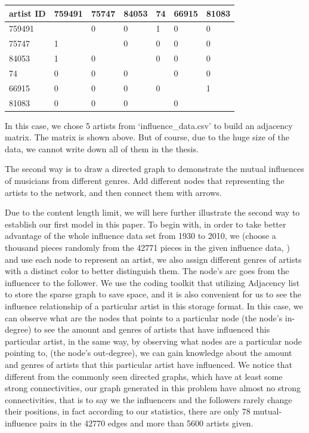 \documentclass[12pt]{article}
\begin{document}
\begin{table}[h]
\centering
\begin{tabular}{|l|l|l|l|l|l|l|}
\hline
artist ID & 759491 & 75747 & 84053 & 74 & 66915 & 81083 \\ \hline
759491              & \      & 0     & 0     & 1  & 0     & 0     \\ \hline
75747               & 1      & \     & 0     & 0  & 0     & 0     \\ \hline
84053               & 1      & 0     & \     & 0  & 0     & 0     \\ \hline
74                  & 0      & 0     & 0     & \  & 0     & 0     \\ \hline
66915               & 0      & 0     & 0     & 0  & \     & 1     \\ \hline
81083               & 0      & 0     & 0     &    & 0     & \     \\ \hline
\end{tabular}
\end{table}
\begin{center}

In this case, we chose 5 artists from `influence\_data.csv' to build an adjacency matrix. The matrix is shown above. But of course, due to the huge size of the data, we cannot write down all of them in the thesis.
\end{center}\quad\;
The second way is to draw a directed graph to demonstrate the mutual influences of musicians from different genres.
Add different nodes that representing the artists to the network, and then connect them with arrows. \par
Due to the content length limit, we will here further illustrate the second way to establish our first model in this paper.  
To begin with, in order to take better advantage of the whole influence data set from 1930 to 2010, we (choose a thousand pieces randomly from the 42771 pieces in the given influence data, ) and use each node to represent an artist, we also assign different genres of artists with a distinct color to better distinguish them. The node's arc goes from the influencer to the follower.
We use the coding toolkit that utilizing Adjacency list to store the sparse graph to save space, and it is also convenient for us to see the influence relationship of a particular artist in this storage format. 
In this case, we can observe what are the nodes that points to a particular node (the node's in-degree) to see the amount and genres of artists that have influenced this particular artist, in the same way, by observing what nodes are a particular node pointing to, (the node's out-degree), we can gain knowledge about the amount and genres of artists that this particular artist have influenced.
We notice that different from the commonly seen directed graphs, which have at least some strong connectivities, our graph generated in this problem have almost no strong connectivities, that is to say we the influencers and the followers rarely change their positions, in fact according to our statistics, there are only 78 mutual-influence pairs in the 42770 edges and more than 5600 artists given.
\end{document}
